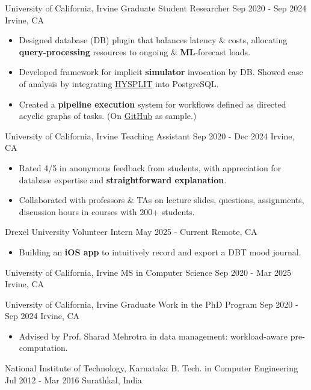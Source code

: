     {University of California, Irvine}
    {Graduate Student Researcher}
    {Sep 2020 - Sep 2024}
    {Irvine, CA}
    {
    \begin{itemize}
        \item Designed database (DB) plugin that balances latency \& costs,
        allocating \textbf{query-processing} resources to ongoing \& \textbf{ML}-forecast loads.
    
        \item Developed framework for implicit  \textbf{simulator} invocation by DB. 
        Showed ease of analysis by integrating \href{https://www.ready.noaa.gov/HYSPLIT.php}{HYSPLIT} into PostgreSQL. 
        
        \item Created a \textbf{pipeline execution} system for workflows defined as directed acyclic graphs of tasks. (On \href{https://github.com/sriram-rao/rush}{GitHub} as sample.) 
    \end{itemize} 
     } 

    {University of California, Irvine}
    {Teaching Assistant}
    {Sep 2020 - Dec 2024}
    {Irvine, CA}
    {
    \begin{itemize}
        \item Rated 4/5 in anonymous feedback from students, with appreciation for database expertise and \textbf{straightforward explanation}. 
    
        \item Collaborated with professors \& TAs on lecture slides, questions, assignments, discussion hours in courses with 200+ students. 
 
    \end{itemize} 
     } 

    {Drexel University}
    {Volunteer Intern}
    {May 2025 - Current}
    {Remote, CA}
    {
    \begin{itemize}
        \item Building an \textbf{iOS app} to intuitively record and export a DBT mood journal. 
    \end{itemize}
    }

    {University of California, Irvine}
    {MS in Computer Science}
    {Sep 2020 - Mar 2025}
    {Irvine, CA}
    {}

    {University of California, Irvine}
    {Graduate Work in the PhD Program}
    {Sep 2020 - Sep 2024}
    {Irvine, CA}
    {
    \begin{itemize}
        \item Advised by Prof. Sharad Mehrotra in data management: workload-aware pre-computation.%
    \end{itemize}
    }

    {National Institute of Technology, Karnataka}
    {B. Tech. in Computer Engineering}
    {Jul 2012 - Mar 2016}
    {Surathkal, India}
    {}